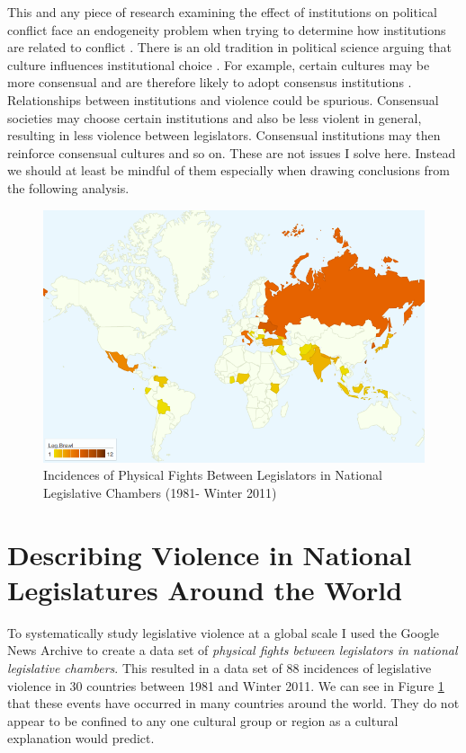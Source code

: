\documentclass[a4paper]{article}\usepackage{graphicx, color}
\begin{document}
This and any piece of research examining the effect of institutions on political conflict face an endogeneity problem when trying to determine how institutions are related to conflict \citep[][751]{Carey2000}. There is an old tradition in political science \citep[][528--529]{Frye1997} arguing that culture influences institutional choice \citep[in particular see][]{Almond1963}. For example, certain cultures may be more consensual and are therefore likely to adopt consensus institutions \citep[][22-23]{Lijphart2003}. Relationships between institutions and violence could be spurious. Consensual societies may choose certain institutions and also be less violent in general, resulting in less violence between legislators. Consensual institutions may then reinforce consensual cultures and so on. These are not issues I solve here. Instead we should at least be mindful of them especially when drawing conclusions from the following analysis.

\begin{figure}[h!]
    \centering
    \caption{Incidences of Physical Fights Between Legislators in National Legislative Chambers (1981- Winter 2011)}
    \label{leg_map}
        \includegraphics[width = 13cm]{incidence_map.png}
\end{figure}

\section{Describing Violence in National Legislatures Around the World}

To systematically study legislative violence at a global scale I used the Google News Archive to create a data set of {\emph{physical fights between legislators in national legislative chambers}}. This resulted in a data set of 88 incidences of legislative violence in 30 countries between 1981 and Winter 2011. We can see in Figure \ref{leg_map} that these events have occurred in many countries around the world. They do not appear to be confined to any one cultural group or region as a cultural explanation would predict. 
\end{document}
